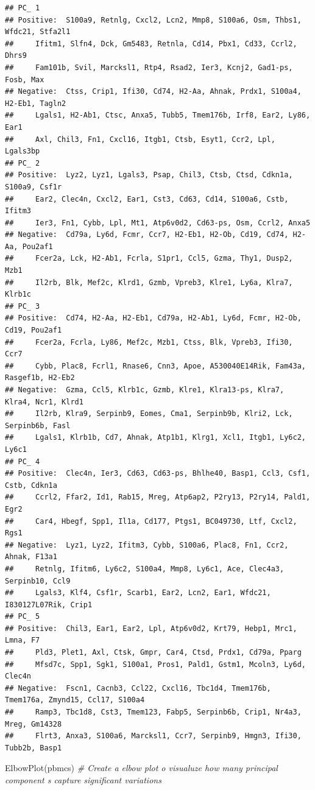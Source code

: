 \documentclass[
]{article}
\newenvironment{Shaded}{\begin{snugshade}}{\end{snugshade}}
\newcommand{\CommentTok}[1]{\textcolor[rgb]{0.56,0.35,0.01}{\textit{#1}}}
\newcommand{\FunctionTok}[1]{\textcolor[rgb]{0.00,0.00,0.00}{#1}}
\newcommand{\NormalTok}[1]{#1}
\begin{document}
\begin{verbatim}
## PC_ 1 
## Positive:  S100a9, Retnlg, Cxcl2, Lcn2, Mmp8, S100a6, Osm, Thbs1, Wfdc21, Stfa2l1 
##     Ifitm1, Slfn4, Dck, Gm5483, Retnla, Cd14, Pbx1, Cd33, Ccrl2, Dhrs9 
##     Fam101b, Svil, Marcksl1, Rtp4, Rsad2, Ier3, Kcnj2, Gad1-ps, Fosb, Max 
## Negative:  Ctss, Crip1, Ifi30, Cd74, H2-Aa, Ahnak, Prdx1, S100a4, H2-Eb1, Tagln2 
##     Lgals1, H2-Ab1, Ctsc, Anxa5, Tubb5, Tmem176b, Irf8, Ear2, Ly86, Ear1 
##     Axl, Chil3, Fn1, Cxcl16, Itgb1, Ctsb, Esyt1, Ccr2, Lpl, Lgals3bp 
## PC_ 2 
## Positive:  Lyz2, Lyz1, Lgals3, Psap, Chil3, Ctsb, Ctsd, Cdkn1a, S100a9, Csf1r 
##     Ear2, Clec4n, Cxcl2, Ear1, Cst3, Cd63, Cd14, S100a6, Cstb, Ifitm3 
##     Ier3, Fn1, Cybb, Lpl, Mt1, Atp6v0d2, Cd63-ps, Osm, Ccrl2, Anxa5 
## Negative:  Cd79a, Ly6d, Fcmr, Ccr7, H2-Eb1, H2-Ob, Cd19, Cd74, H2-Aa, Pou2af1 
##     Fcer2a, Lck, H2-Ab1, Fcrla, S1pr1, Ccl5, Gzma, Thy1, Dusp2, Mzb1 
##     Il2rb, Blk, Mef2c, Klrd1, Gzmb, Vpreb3, Klre1, Ly6a, Klra7, Klrb1c 
## PC_ 3 
## Positive:  Cd74, H2-Aa, H2-Eb1, Cd79a, H2-Ab1, Ly6d, Fcmr, H2-Ob, Cd19, Pou2af1 
##     Fcer2a, Fcrla, Ly86, Mef2c, Mzb1, Ctss, Blk, Vpreb3, Ifi30, Ccr7 
##     Cybb, Plac8, Fcrl1, Rnase6, Cnn3, Apoe, A530040E14Rik, Fam43a, Rasgef1b, H2-Eb2 
## Negative:  Gzma, Ccl5, Klrb1c, Gzmb, Klre1, Klra13-ps, Klra7, Klra4, Ncr1, Klrd1 
##     Il2rb, Klra9, Serpinb9, Eomes, Cma1, Serpinb9b, Klri2, Lck, Serpinb6b, Fasl 
##     Lgals1, Klrb1b, Cd7, Ahnak, Atp1b1, Klrg1, Xcl1, Itgb1, Ly6c2, Ly6c1 
## PC_ 4 
## Positive:  Clec4n, Ier3, Cd63, Cd63-ps, Bhlhe40, Basp1, Ccl3, Csf1, Cstb, Cdkn1a 
##     Ccrl2, Ffar2, Id1, Rab15, Mreg, Atp6ap2, P2ry13, P2ry14, Pald1, Egr2 
##     Car4, Hbegf, Spp1, Il1a, Cd177, Ptgs1, BC049730, Ltf, Cxcl2, Rgs1 
## Negative:  Lyz1, Lyz2, Ifitm3, Cybb, S100a6, Plac8, Fn1, Ccr2, Ahnak, F13a1 
##     Retnlg, Ifitm6, Ly6c2, S100a4, Mmp8, Ly6c1, Ace, Clec4a3, Serpinb10, Ccl9 
##     Lgals3, Klf4, Csf1r, Scarb1, Ear2, Lcn2, Ear1, Wfdc21, I830127L07Rik, Crip1 
## PC_ 5 
## Positive:  Chil3, Ear1, Ear2, Lpl, Atp6v0d2, Krt79, Hebp1, Mrc1, Lmna, F7 
##     Pld3, Plet1, Axl, Ctsk, Gmpr, Car4, Ctsd, Prdx1, Cd79a, Pparg 
##     Mfsd7c, Spp1, Sgk1, S100a1, Pros1, Pald1, Gstm1, Mcoln3, Ly6d, Clec4n 
## Negative:  Fscn1, Cacnb3, Ccl22, Cxcl16, Tbc1d4, Tmem176b, Tmem176a, Zmynd15, Ccl17, S100a4 
##     Ramp3, Tbc1d8, Cst3, Tmem123, Fabp5, Serpinb6b, Crip1, Nr4a3, Mreg, Gm14328 
##     Flrt3, Anxa3, S100a6, Marcksl1, Ccr7, Serpinb9, Hmgn3, Ifi30, Tubb2b, Basp1
\end{verbatim}

\begin{Shaded}
\begin{Highlighting}[]
\FunctionTok{ElbowPlot}\NormalTok{(pbmcs) }\CommentTok{\# Create a elbow plot o visualuze how many principal component s capture significant variations}
\end{Highlighting}
\end{Shaded}
\end{document}
